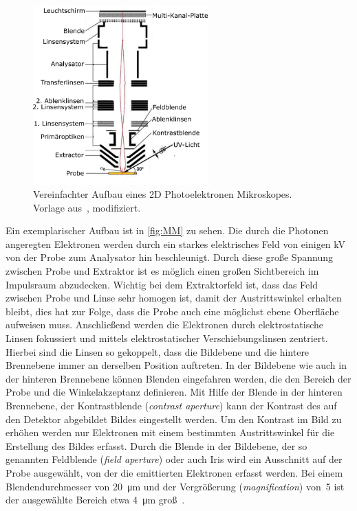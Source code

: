         \begin{figure}
            \centering
            \includegraphics[width=0.6\textwidth]{PEEM_schemaneu.png}
            \caption{Vereinfachter Aufbau eines 2D Photoelektronen Mikroskopes. Vorlage aus~\cite{KUCH}, modifiziert.}
            \label{fig:MM}
        \end{figure}
        Ein exemplarischer Aufbau ist in \autoref{fig:MM} zu sehen.
        Die durch die Photonen angeregten Elektronen werden durch ein starkes elektrisches Feld von einigen \si{\kilo\volt} von der Probe zum Analysator hin beschleunigt.
        Durch diese große Spannung zwischen Probe und Extraktor ist es möglich einen großen Sichtbereich im Impulsraum abzudecken.
        Wichtig bei dem Extraktorfeld ist, dass das Feld zwischen Probe und Linse sehr homogen ist, damit der Austrittswinkel erhalten bleibt, dies hat zur Folge, dass die Probe auch eine möglichst ebene Oberfläche aufweisen muss.
        Anschließend werden die Elektronen durch elektrostatische Linsen fokussiert und mittels elektrostatischer Verschiebungslinsen zentriert.
        Hierbei sind die Linsen so gekoppelt, dass die Bildebene und die hintere Brennebene immer an derselben Position auftreten.
        In der Bildebene wie auch in der hinteren Brennebene können Blenden eingefahren werden, die den Bereich der Probe und die Winkelakzeptanz definieren.
        Mit Hilfe der Blende in der hinteren Brennebene, der Kontrastblende (\textit{contrast aperture}) kann der Kontrast des auf den Detektor abgebildet Bildes eingestellt werden.
        Um den Kontrast im Bild zu erhöhen werden nur Elektronen mit einem bestimmten Austrittswinkel für die Erstellung des Bildes erfasst.
        Durch die Blende in der Bildebene, der so genannten Feldblende (\textit{field aperture}) oder auch Iris wird ein Ausschnitt auf der Probe ausgewählt, von der die emittierten Elektronen erfasst werden.
        Bei einem Blendendurchmesser von \SI{20}{\micro\meter} und der Vergrößerung (\textit{magnification}) von~\num{5} ist der ausgewählte Bereich etwa \SI{4}{\micro\meter} groß~\cite{SPECS-MM}.

